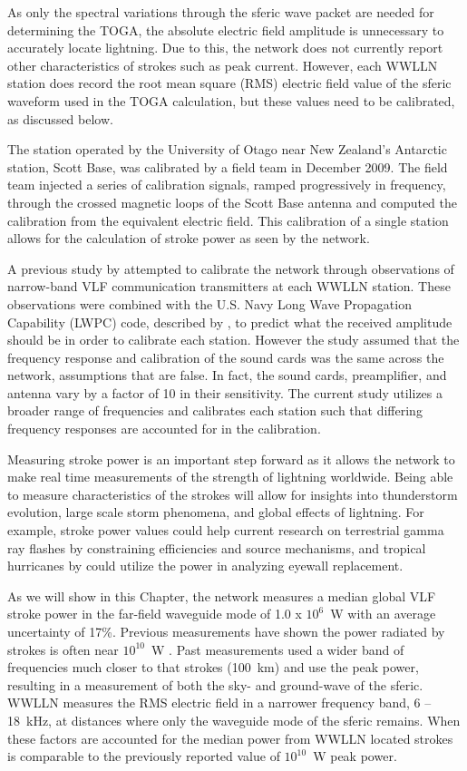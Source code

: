 As only the spectral variations through the sferic wave packet are needed for determining the TOGA, the absolute electric field amplitude is unnecessary to accurately locate lightning. Due to this, the network does not currently report other characteristics of strokes such as peak current.
However, each WWLLN station does record the root mean square (RMS) electric field value of the sferic waveform used in the TOGA calculation, but these values need to be calibrated, as discussed below.

The station operated by the University of Otago near New Zealand's Antarctic station, Scott Base, was calibrated by a field team in December 2009.
The field team injected a series of calibration signals, ramped progressively in frequency, through the crossed magnetic loops of the Scott Base antenna and computed the calibration from the equivalent electric field.
This calibration of a single station allows for the calculation of stroke power as seen by the network.

A previous study by \citet{Rodger2006} attempted to calibrate the network through observations of narrow-band VLF communication transmitters at each WWLLN station.
These observations were combined with the U.S. Navy Long Wave Propagation Capability (LWPC) code, described by \citet{Ferguson1998}, to predict what the received amplitude should be in order to calibrate each station.
However the study assumed that the frequency response and calibration of the sound cards was the same across the network, assumptions that are false.
In fact, the sound cards, preamplifier, and antenna vary by a factor of 10 in their sensitivity. 
The current study utilizes a broader range of frequencies and calibrates each station such that differing frequency responses are accounted for in the calibration.

Measuring stroke power is an important step forward as it allows the network to make real time measurements of the strength of lightning worldwide.
Being able to measure characteristics of the strokes will allow for insights into thunderstorm evolution, large scale storm phenomena, and global effects of lightning.
For example, stroke power values could help current research on terrestrial gamma ray flashes by \citet{Briggs2011} constraining efficiencies and source mechanisms, and tropical hurricanes by \citet{Thomas2010d} could utilize the power in analyzing eyewall replacement.

As we will show in this Chapter, the network measures a median global VLF stroke power in the far-field waveguide mode of 1.0 x $10^6$~W with an average uncertainty of 17\%.
Previous measurements have shown the power radiated by strokes is often near $10^{10}$~W \citep{Krider1983}.
Past measurements used a wider band of frequencies much closer to that strokes (100~km) and use the peak power, resulting in a measurement of both the sky- and ground-wave of the sferic.
WWLLN measures the RMS electric field in a narrower frequency band, 6 -- 18~kHz, at distances where only the waveguide mode of the sferic remains.
When these factors are accounted for the median power from WWLLN located strokes is comparable to the previously reported value of $10^{10}$~W peak power.

